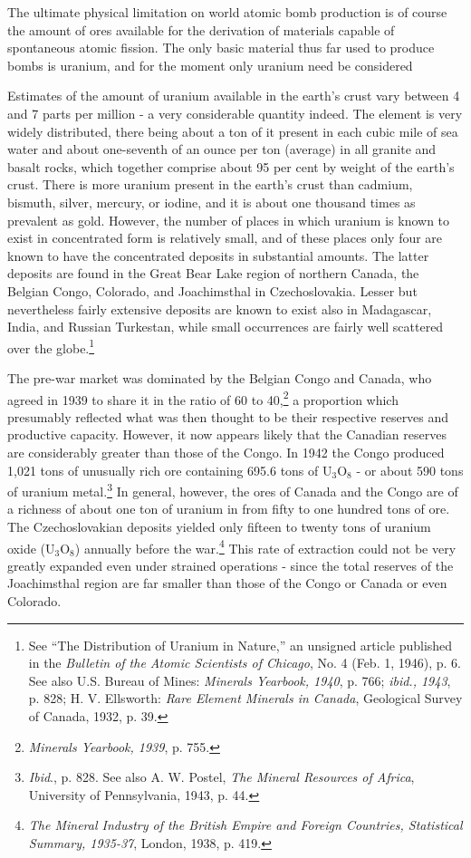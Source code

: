 The ultimate physical limitation on world atomic bomb production is of course the amount of ores available for the derivation of materials capable of spontaneous atomic fission. The only basic material thus far used to produce bombs is uranium, and for the moment only uranium need be considered

Estimates of the amount of uranium available in the earth's crust vary between 4 and 7 parts per million - a very considerable quantity indeed. The element is very widely distributed, there being about a ton of it present in each cubic mile of sea water and about one-seventh of an ounce per ton (average) in all granite and basalt rocks, which together comprise about 95 per cent by weight of the earth's crust. There is more uranium present in the earth's crust than cadmium, bismuth, silver, mercury, or iodine, and it is about one thousand times as prevalent as gold. However, the number of places in which uranium is known to exist in concentrated form is relatively small, and of these places only four are known to have the concentrated deposits in substantial amounts. The latter deposits are found in the Great Bear Lake region of northern Canada, the Belgian Congo, Colorado, and Joachimsthal in Czechoslovakia. Lesser but nevertheless fairly extensive deposits are known to exist also in Madagascar, India, and Russian Turkestan, while small occurrences are fairly well scattered over the globe.\footnote{See ``The Distribution of Uranium in Nature,'' an unsigned article published in the \textit{Bulletin of the Atomic Scientists of Chicago}, No. 4 (Feb. 1, 1946), p. 6. See also U.S. Bureau of Mines: \textit{Minerals Yearbook, 1940}, p. 766; \textit{ibid., 1943}, p. 828; H. V. Ellsworth: \textit{Rare Element Minerals in Canada}, Geological Survey of Canada, 1932, p. 39.}

The pre-war market was dominated by the Belgian Congo and Canada, who agreed in 1939 to share it in the ratio of 60 to 40,\footnote{\textit{Minerals Yearbook, 1939}, p. 755.} a proportion which presumably reflected what was then thought to be their respective reserves and productive capacity. However, it now appears likely that the Canadian reserves are considerably greater than those of the Congo. In 1942 the Congo produced 1,021 tons of unusually rich ore containing 695.6 tons of U$_3$O$_8$ - or about 590 tons of uranium metal.\footnote{\textit{Ibid}., p. 828. See also A. W. Postel, \textit{The Mineral Resources of Africa}, University of Pennsylvania, 1943, p. 44.} In general, however, the ores of Canada and the Congo are of a richness of about one ton of uranium in from fifty to one hundred tons of ore. The Czechoslovakian deposits yielded only fifteen to twenty tons of uranium oxide (U$_3$O$_8$) annually before the war.\footnote{\textit{The Mineral Industry of the British Empire and Foreign Countries, Statistical Summary, 1935-37}, London, 1938, p. 419.} This rate of extraction could not be very greatly expanded even under strained operations - since the total reserves of the Joachimsthal region are far smaller than those of the Congo or Canada or even Colorado.

